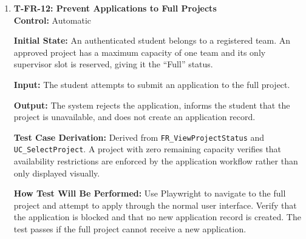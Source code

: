 \documentclass[12pt, titlepage]{article}
\begin{document}
\begin{enumerate}
\textbf{Input:} The student opens the project catalog and views both projects.

\textbf{Output:} Project A displays ``Open'' with a maximum capacity of 2 teams, 1 reserved slot, and 1 remaining available slot. Project B displays ``Full'' with a maximum capacity of 1 team, 1 reserved slot, and 0 remaining available slots.

\textbf{Test Case Derivation:} Derived from \texttt{FR\_ViewProjectStatus}. Remaining capacity is calculated as $C_{remaining} = C_{max} - R$ where $R$ is reserved slot and $C_{max}$ is maximum capacity. Project A has $2-1=1$ available slot, while Project B has $1-1=0$. These cases verify the correct availability states.

\textbf{How Test Will Be Performed:} Configure both projects with the specified capacities and reserved slots. Use Playwright to view their catalog entries and compare the displayed statuses and maximum capacities with the expected values.

\item \label{T-FR-12}\textbf{T-FR-12: Prevent Applications to Full Projects}\\

\textbf{Control:} Automatic

\textbf{Initial State:} An authenticated student belongs to a registered team. An approved project has a maximum capacity of one team and its only supervisor slot is reserved, giving it the ``Full'' status.

\textbf{Input:} The student attempts to submit an application to the full project.

\textbf{Output:} The system rejects the application, informs the student that the project is unavailable, and does not create an application record.

\textbf{Test Case Derivation:} Derived from \texttt{FR\_ViewProjectStatus} and \texttt{UC\_SelectProject}. A project with zero remaining capacity verifies that availability restrictions are enforced by the application workflow rather than only displayed visually.

\textbf{How Test Will Be Performed:} Use Playwright to navigate to the full project and attempt to apply through the normal user interface. Verify that the application is blocked and that no new application record is created. The test passes if the full project cannot receive a new application.

\end{enumerate}
\end{document}
